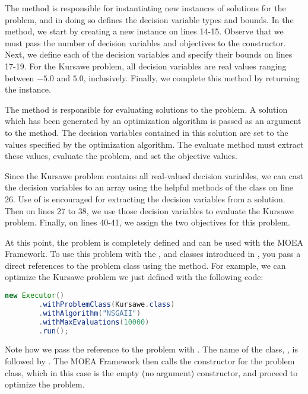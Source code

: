 The  method is responsible for instantiating new instances of solutions for the problem, and in doing so defines the decision variable types and bounds.  In the  method, we start by creating a new  instance on lines 14-15.  Observe that we must pass the number of decision variables and objectives to the  constructor.  Next, we define each of the decision variables and specify their bounds on lines 17-19.  For the Kursawe problem, all decision variables are real values ranging between $-5.0$ and $5.0$, inclusively.  Finally, we complete this method by returning the  instance.

The  method is responsible for evaluating solutions to the problem.  A solution which has been generated by an optimization algorithm is passed as an argument to the  method.  The decision variables contained in this solution are set to the values specified by the optimization algorithm.  The evaluate method must extract these values, evaluate the problem, and set the objective values.

Since the Kursawe problem contains all real-valued decision variables, we can cast the decision variables to an array using the helpful methods of the  class on line 26.  Use of  is encouraged for extracting the decision variables from a solution.  Then on lines 27 to 38, we use those decision variables to evaluate the Kursawe problem.  Finally, on lines 40-41, we assign the two objectives for this problem.

At this point, the problem is completely defined and can be used with the MOEA Framework.  To use this problem with the ,  and  classes introduced in , you pass a direct references to the problem class using the  method.  For example, we can optimize the Kursawe problem we just defined with the following code:

\begin{lstlisting}[language=Java]
new Executor()
		.withProblemClass(Kursawe.class)
		.withAlgorithm("NSGAII")
		.withMaxEvaluations(10000)
		.run();
\end{lstlisting}

Note how we pass the reference to the problem with .  The name of the class, , is followed by .  The MOEA Framework then calls the constructor for the problem class, which in this case is the empty (no argument) constructor, and proceed to optimize the problem.

